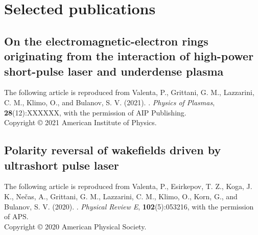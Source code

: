 \documentclass[10pt, a4paper, twoside, openright]{report}
\newcommand{\link}[3][blue]{\href{#2}{\color{#1}{#3}}}%
\begin{document}
\chapter{Selected publications\label{chap:selected_publications}}
%

\newpage
\thispagestyle{empty}
\mbox{}

\newpage
\section{On the electromagnetic-electron rings originating from the interaction of high-power short-pulse laser and underdense plasma \label{sec:paper_1}}

The following article is reproduced from Valenta, P., Grittani, G. M., Lazzarini, C. M., Klimo, O., and Bulanov, S. V. (2021). \link{http://dx.doi.org/}{On the electromagnetic-electron rings originating from the interaction of high-power short-pulse laser and underdense plasma}. \textit{Physics of Plasmas}, \textbf{28}(12):XXXXXX, with the permission of AIP Publishing. \\

\noindent Copyright {\copyright} {2021} {American Institute of Physics}.

\newpage
\thispagestyle{empty}
\mbox{}

%


\newpage
\section{Polarity reversal of wakefields driven by ultrashort pulse laser \label{sec:paper_2}}

The following article is reproduced from Valenta, P., Esirkepov, T. Z., Koga, J. K., Nečas, A., Grittani, G. M., Lazzarini, C. M., Klimo, O., Korn, G., and Bulanov, S. V. (2020). \link{http://dx.doi.org/10.1103/PhysRevE.102.053216}{Polarity reversal of wakefields driven by ultrashort pulse laser}. \textit{Physical Review E}, \textbf{102}(5):053216, with the permission of APS. \\

\noindent Copyright {\copyright} {2020} {American Physical Society}.

\newpage
\mbox{}
\thispagestyle{empty}

\newpage

\end{document}
